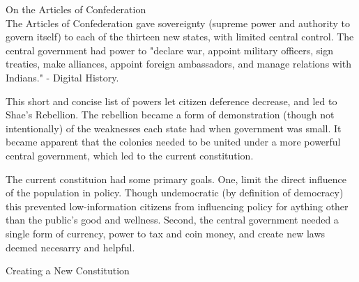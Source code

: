 \documentclass{article}
\begin{document}
\noindent
\Large
On the Articles of Confederation\\
\normalsize
\indent
The Articles of Confederation gave sovereignty (supreme power and authority to govern itself) to each of the thirteen new states, with limited central control. The central government had power to "declare war, appoint military officers, sign treaties, make alliances, appoint foreign ambassadors, and manage relations with Indians." - Digital History.

This short and concise list of powers let citizen deference decrease, and led to Shae's Rebellion. The rebellion became a form of demonstration (though not intentionally) of the weaknesses each state had when government was small. It became apparent that the colonies needed to be united under a more powerful central government, which led to the current constitution.

The current constituion had some primary goals. One, limit the direct influence of the population in policy. Though undemocratic (by definition of democracy) this prevented low-information citizens from influencing policy for aything other than the public's good and wellness. Second, the central government needed a single form of currency, power to tax and coin money, and create new laws deemed necesarry and helpful.

\noindent
\Large
Creating a New Constitution\\
\normalsize
\indent
\end{document}
